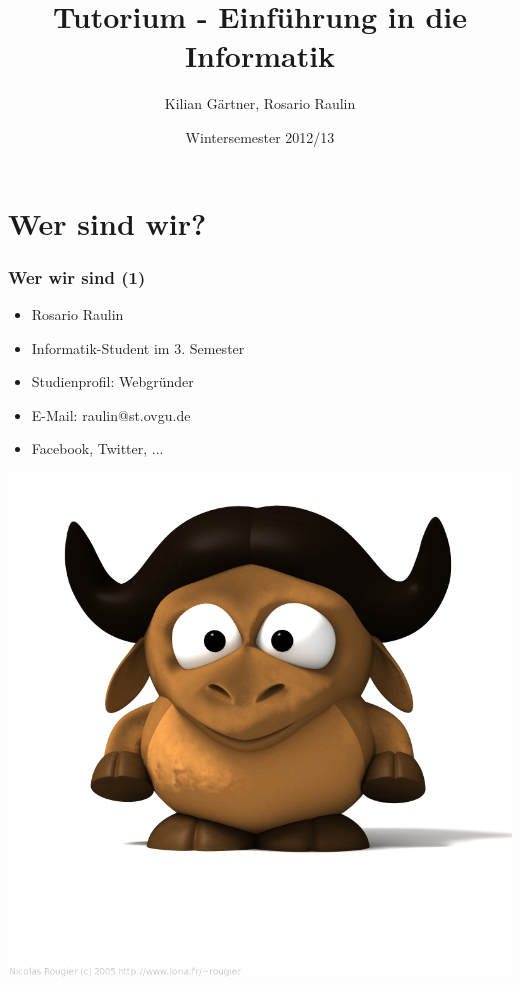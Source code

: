 \documentclass[12pt]{beamer}
\title{Tutorium - Einführung in die Informatik}
\author{Kilian Gärtner, Rosario Raulin}
\date{Wintersemester 2012/13}
\begin{document}
\frame{\titlepage}

\section{Wer sind wir?}

\begin{frame}

	\frametitle{Wer wir sind (1)}

	\begin{itemize}
		\item Rosario Raulin
		\item Informatik-Student im 3. Semester
		\item Studienprofil: Webgründer
		\item E-Mail: raulin@st.ovgu.de
		\item Facebook, Twitter, ...
	\end{itemize}

	\begin{flushright}
		\includegraphics[scale=0.1]{src/img/babygnu}
	\end{flushright}

\end{frame}
\end{document}
